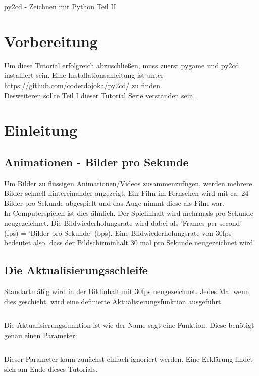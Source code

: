 \documentclass{\VorlagenPfad/coderdojokatext}
\renewcommand{\Titel}{py2cd - Zeichnen mit Python Teil II}
\begin{document}
\begin{center}
	{\huge \Titel}
\end{center}

\section{Vorbereitung}
Um diese Tutorial erfolgreich abzuschließen, muss zuerst pygame und py2cd installiert sein. Eine Installationsanleitung ist unter \url{https://github.com/coderdojoka/py2cd/} zu finden.
\\
Desweiteren sollte Teil I dieser Tutorial Serie verstanden sein.
\section{Einleitung}

\subsection{Animationen - Bilder pro Sekunde}
Um Bilder zu flüssigen Animationen/Videos zusammenzufügen, werden mehrere Bilder schnell hintereinander angezeigt. Ein Film im Fernsehen wird mit ca. 24 Bilder pro Sekunde abgespielt und das Auge nimmt diese als Film war.
\\In Computerspielen ist dies ähnlich. Der Spielinhalt wird mehrmals pro Sekunde neugezeichnet. Die Bildwiederholungsrate wird dabei als 'Frames per second' (fps) = 'Bilder pro Sekunde' (bps). Eine Bildwiederholungsrate von 30fps bedeutet also, dass der Bildschirminhalt 30 mal pro Sekunde neugezeichnet wird!

\subsection{Die Aktualisierungsschleife}
Standartmäßig wird in  der Bildinhalt mit 30fps neugezeichnet. Jedes Mal wenn dies geschieht, wird eine definierte Aktualisierungsfunktion ausgeführt.

\inputminted[firstline=3]{python}{../../../Beispiele/py2cd/aktualisierungs_funktion.py}

\begin{merkbox}
Die Aktualisierungsfunktion ist wie der Name sagt eine Funktion. Diese benötigt genau einen Parameter:

\inputminted[firstline=7, lastline=10]{python}{../../../Beispiele/py2cd/aktualisierungs_funktion.py}
\label{erklaerung}Dieser Parameter kann zunächst einfach ignoriert werden. Eine Erklärung findet sich am Ende dieses Tutorials.

\end{merkbox}
\end{document}
